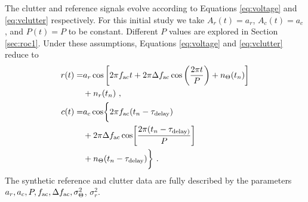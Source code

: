 \documentclass[pra,superscriptaddress,reprint,amsmath,amssymb,nofootinbib]{revtex4-2}
\begin{document}
The clutter and reference signals evolve according to Equations \eqref{eq:voltage} and \eqref{eq:vclutter} respectively. For this initial study we take $A_r(t) = a_r$, $A_c(t) = a_c$, and $P(t) = P$ to be constant. Different $P$ values are explored in Section \ref{sec:roc1}. Under these assumptions, Equations \eqref{eq:voltage} and \eqref{eq:vclutter} reduce to 
\begin{align}
 	r(t) = & a_r \cos \left[ 2 \pi f_{\rm ac} t +2 \pi \Delta f_{\rm ac} \cos\left(\frac{2 \pi t}{P}\right) + n_{\Theta} (t_n) \right] \nonumber \\ 
 	&+n_r(t_n) \ , \\ 
	c(t) = & a_c \cos \biggl \{ 2 \pi f_{\rm ac} (t_n - \tau_{\rm delay}) \nonumber \\ 
	&+ 2 \pi \Delta f_{\rm ac} \cos \biggl [ \frac{2 \pi (t_n - \tau_{\rm delay)}}{P} \biggr ] \nonumber \\ 
	&+ n_{\Theta} (t_n - \tau_{\rm delay}) \biggr \} \ .
	\label{eq:clutterequation}
\end{align}
The synthetic reference and clutter data are fully described by the parameters $a_r,a_c,P, f_{\rm ac}, \Delta f_{\rm ac},\sigma^2_{\Theta}$, $\sigma_r^2$. \newline 
\end{document}

